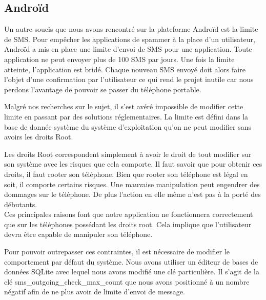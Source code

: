 
\subsection{Androïd}



Un autre soucis que nous avons rencontré sur la plateforme Androïd est la limite de SMS. Pour empêcher
les applications de spammer à la place d'un utilisateur, Androïd a mis en place une limite d'envoi de 
SMS pour une application. Toute application ne peut envoyer plus de 100 SMS par jours. Une fois la limite
atteinte, l'application est bridé. Chaque nouveau SMS envoyé doit alors faire l'objet d'une confirmation
par l'utilisateur ce qui rend le projet inutile car nous perdons l'avantage de pouvoir se passer du 
téléphone portable.

Malgré nos recherches sur le sujet, il s'est avéré impossible de modifier cette limite en passant par
des solutions réglementaires. La limite est défini dans la base de donnée système du système d'exploitation
qu'on ne peut modifier sans avoirs les droits Root.

Les droits Root correspondent simplement à avoir le droit de tout modifier sur son système avec les 
risques que cela comporte. Il faut savoir que pour obtenir ces droits, il faut rooter son téléphone.
Bien que rooter son téléphone est légal en soit, il comporte certains risques. Une mauvaise manipulation
peut engendrer des dommages sur le téléphone. De plus l'action en elle même n'est pas à la porté des 
débutants.
\\


Ces principales raisons font que notre application ne fonctionnera correctement que sur les téléphones
possédant les droits root. Cela implique que l'utilisateur devra être capable de manipuler son téléphone.

Pour pouvoir outrepasser ces contraintes, il est nécessaire de modifier le comportement par défaut du 
système. Nous avons utiliser un éditeur de bases de données SQLite avec lequel nous avons modifié une clé 
particulière. Il s'agit de la clé sms\_outgoing\_check\_max\_count que nous avons positionné à un nombre négatif afin de ne plus avoir de limite d'envoi de message.

